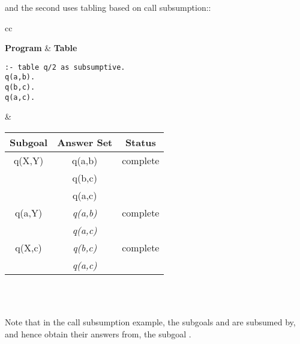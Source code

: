 \noindent
and the second uses tabling based on call subsumption::

\begin{center}
\begin{tabular}{cc}\hline \hline
{} \\ \hline \hline
\rule[-2ex]{0ex}{5ex} \textbf{Program} & \textbf{Table} \\
\begin{minipage}{17em}
\begin{verbatim}
:- table q/2 as subsumptive.
q(a,b).
q(b,c).
q(a,c).
\end{verbatim}
\end{minipage}
&
\begin{tabular}{|c|c|c|} \hline
  Subgoal & Answer Set & Status \\ \hline \hline
  q(X,Y) & q(a,b) & complete \\
         & q(b,c) & \\
         & q(a,c) & \\ \hline
  q(a,Y) & \textit{q(a,b)} & complete \\
         & \textit{q(a,c)} & \\ \hline
  q(X,c) & \textit{q(b,c)} & complete \\
         & \textit{q(a,c)} & \\ \hline
\end{tabular} \\
\vspace*{-2ex} \\ \hline \hline
\end{tabular}
\end{center}

\noindent
Note that in the call subsumption example, the subgoals  and
 are subsumed by, and hence obtain their answers from,
the subgoal \@.

\vspace{2ex}

